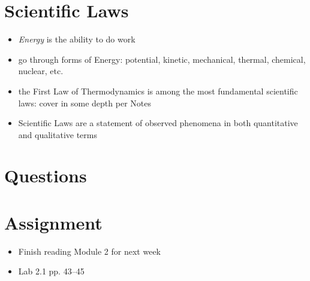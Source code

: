 \documentclass[10pt, oneside]{article}   	%
\begin{document}
\section*{Scientific Laws}
\begin{itemize}
\item \emph{Energy} is the ability to do work
\item go through forms of Energy: potential, kinetic, mechanical, thermal, chemical, nuclear, etc.
\item the First Law of Thermodynamics is among the most fundamental scientific laws: cover in some depth per Notes
\item Scientific Laws are a statement of observed phenomena in both quantitative and qualitative terms
\end{itemize}

\section*{Questions}

\section*{Assignment}
\begin{itemize}
\item Finish reading Module 2 for next week
\item Lab 2.1 pp. 43--45
\end{itemize}
\end{document}

